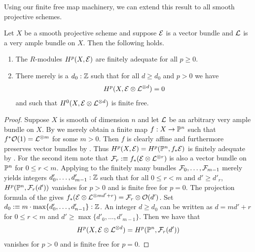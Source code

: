 Using our finite free map machinery, we can extend this result to all smooth projective schemes.

\begin{corollary}
  \label{cohomology-of-twisted-vectorbundles-on-sm-projective-schemes}
  Let $X$ be a smooth projective scheme and suppose $\mathcal{E}$ is a vector bundle and $\mathcal{L}$ is a very ample bundle on $X$.
  Then the following holds.
  \begin{enumerate}
    \item[i)] The $R$-modules $H^p(X, \mathcal{E})$ are finitely adequate for all $p \geq 0$.
    \item[ii)] There merely is a $d_0:\mathbb Z$ such that for all $d \geq d_0$ and $p > 0$ we have
      \[
        H^p(X, \mathcal{E} \otimes \mathcal{L}^{\otimes d}) = 0
      \]
      and such that $H^0(X, \mathcal{E} \otimes \mathcal{L}^{\otimes d})$ is finite free.
  \end{enumerate}
\end{corollary}

\begin{proof}
  Suppose $X$ is smooth of dimension $n$ and let $\mathcal{L}$ be an arbitrary very ample bundle on $X$.
  By  we merely obtain a finite map $f : X \to \mathbb{P}^n$ such that $f^\ast \mathcal{O}(1) = \mathcal{L}^{\otimes m}$ for some $m > 0$.
  Then $f$ is clearly affine and furthermore preserves vector bundles by .
  Thus $H^p(X, \mathcal{E}) = H^p(\mathbb{P}^n, f_\ast \mathcal{E})$ is finitely adequate by .
  For the second item note that $\mathcal{F}_r :\equiv f_\ast(\mathcal{E} \otimes \mathcal{L}^{\otimes r})$ is also a vector bundle on $\mathbb{P}^n$ for $0 \leq r < m$.
  Applying  to the finitely many bundles $\mathcal{F}_0, \hdots, \mathcal{F}_{m-1}$ merely yields integers $d'_0, \hdots, d'_{m-1} : \mathbb Z$ such that for all $0 \leq r < m$ and $d' \geq d'_r$, $H^p(\mathbb{P}^n, \mathcal{F}_r(d'))$ vanishes for $p>0$ and is finite free for $p=0$.
  The projection formula of  the gives $f_\ast(\mathcal{E} \otimes \mathcal{L}^{\otimes md'+r}) = \mathcal{F}_r \otimes \mathcal{O}(d')$.
  Set $d_0 :\equiv m \cdot \max\{d'_0, \hdots, d'_{n-1}\} : \mathbb Z$.
  An integer $d \geq d_0$ can be written as $d = md' +r$ for $0 \leq r < m$ and $d' \geq \max\{d'_0, \hdots, d'_{m-1}\}$.
  Then we have that
  \[
    H^p(X,\mathcal{E} \otimes \mathcal{L}^{\otimes d}) = H^p(\mathbb{P}^n, \mathcal{F}_r (d'))
  \]
  vanishes for $p > 0$ and is finite free for $p=0$.
\end{proof}

